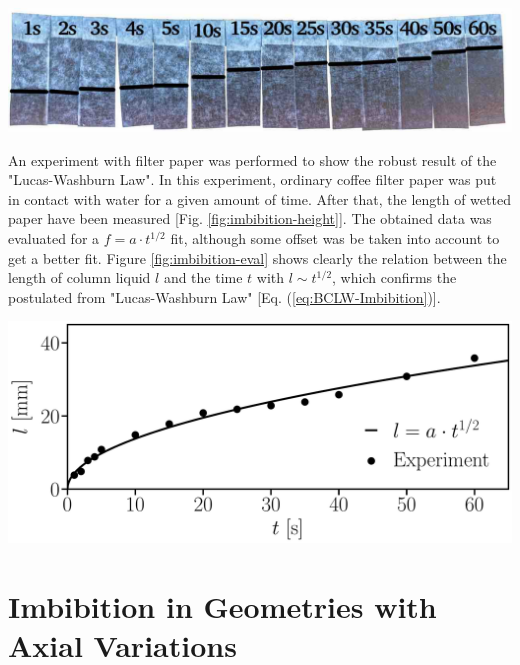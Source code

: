 \documentclass[aip, amsmath, amssymb, reprint, twocolumn, floatfix]{revtex4-1}
\begin{document}
\begin{center}
	\captionsetup{type=figure}
	\includegraphics[width = \linewidth]{../pictures/experiments/filter-paper_water_1s-60s_backlight.pdf}
	\label{fig:imbibition-height}
\end{center}

An experiment with filter paper \cite{Dullien1991} was performed to show the robust result of the "Lucas-Washburn Law". In this experiment, ordinary coffee filter paper was put in contact with water for a given amount of time. After that, the length of wetted paper have been measured [Fig. \ref{fig:imbibition-height}]. The obtained data was evaluated for a $f = a \cdot t^{1/2}$ fit, although some offset was be taken into account to get a better fit. Figure \ref{fig:imbibition-eval} shows clearly the relation between the length of column liquid $l$ and the time $t$ with $l \sim t^{1/2}$, which confirms the postulated from "Lucas-Washburn Law" [Eq. (\ref{eq:BCLW-Imbibition})]. 

\begin{center}
	\captionsetup{type=figure}
	\includegraphics[width = \linewidth]{../pictures/experiments/filter-paper_water_1s-60s_eval_origin-offset.pdf}
	\label{fig:imbibition-eval}
\end{center}

\section{Imbibition in Geometries with Axial Variations}
\label{sec:geometry}
\end{document}
